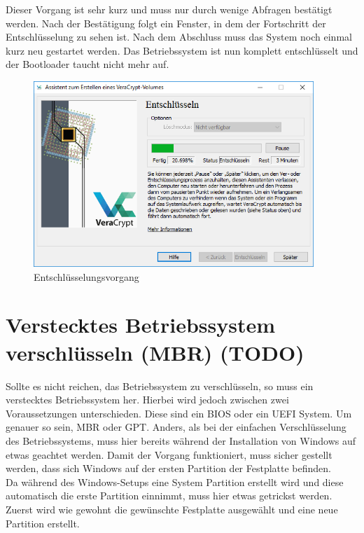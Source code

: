 \documentclass[12pt,a4paper]{scrreprt}
\begin{document}
\noindent Dieser Vorgang ist sehr kurz und muss nur durch wenige Abfragen bestätigt werden. Nach der Bestätigung folgt ein Fenster, in dem der Fortschritt der Entschlüsselung zu sehen ist. Nach dem Abschluss muss das System noch einmal kurz neu gestartet werden. Das Betriebssystem ist nun komplett entschlüsselt und der Bootloader taucht nicht mehr auf.

\begin{figure}[h]
\begin{center}
\includegraphics[width=300pt]{media/systemdecrypt2.png}
\caption{Entschlüsselungsvorgang}
\label{systemdecrypt2}
\end{center}
\end{figure}

\section{Verstecktes Betriebssystem verschlüsseln (MBR) (TODO)}
Sollte es nicht reichen, das Betriebssystem zu verschlüsseln, so muss ein verstecktes Betriebssystem her. Hierbei wird jedoch zwischen zwei Voraussetzungen unterschieden. Diese sind ein BIOS oder ein UEFI System. Um genauer so sein, MBR oder GPT. Anders, als bei der einfachen Verschlüsselung des Betriebssystems, muss hier bereits während der Installation von Windows auf etwas geachtet werden. Damit der Vorgang funktioniert, muss sicher gestellt werden, dass sich Windows auf der ersten Partition der Festplatte befinden.\\

\noindent Da während des Windows-Setups eine System Partition erstellt wird und diese automatisch die erste Partition einnimmt, muss hier etwas getrickst werden. Zuerst wird wie gewohnt die gewünschte Festplatte ausgewählt und eine neue Partition erstellt.
\end{document}
